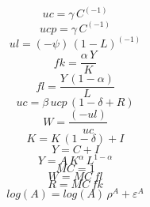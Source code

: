 \begin{dmath*}
uc = {{\gamma}}\, {{C}}^{\left(-1\right)}
\end{dmath*}
\begin{dmath*}
ucp = {{\gamma}}\, {{C}}^{\left(-1\right)}
\end{dmath*}
\begin{dmath*}
ul = \left(-{{\psi}}\right)\, \left(1-{{L}}\right)^{\left(-1\right)}
\end{dmath*}
\begin{dmath*}
fk = \frac{{{\alpha}}\, {{Y}}}{{{K}}}
\end{dmath*}
\begin{dmath*}
fl = \frac{{{Y}}\, \left(1-{{\alpha}}\right)}{{{L}}}
\end{dmath*}
\begin{dmath}
{uc}={{\beta}}\, {ucp}\, \left(1-{{\delta}}+{{R}}\right)
\end{dmath}
\begin{dmath}
{{W}}=\frac{\left(-{ul}\right)}{{uc}}
\end{dmath}
\begin{dmath}
{{K}}={{K}}\, \left(1-{{\delta}}\right)+{{I}}
\end{dmath}
\begin{dmath}
{{Y}}={{C}}+{{I}}
\end{dmath}
\begin{dmath}
{{Y}}={{A}}\, {{K}}^{{{\alpha}}}\, {{L}}^{1-{{\alpha}}}
\end{dmath}
\begin{dmath}
{{MC}}=1
\end{dmath}
\begin{dmath}
{{W}}={{MC}}\, {fl}
\end{dmath}
\begin{dmath}
{{R}}={{MC}}\, {fk}
\end{dmath}
\begin{dmath}
log\left({{A}}\right)=log\left({{A}}\right)\, {{\rho^A}}+{{\varepsilon^A}}
\end{dmath}
